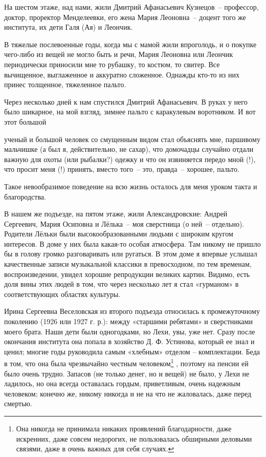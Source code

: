 На шестом этаже, над нами, жили Дмитрий Афанасьевич Кузнецов~-- профессор, доктор, проректор Менделеевки, его жена Мария Леоновна~-- доцент того же института, их дети Галя (Ая) и Леончик.



В тяжелые послевоенные годы, когда мы с мамой жили впроголодь, и о покупке чего-либо из вещей не могло быть  и  речи,  Мария Леоновна или Леончик периодически приносили мне то рубашку, то костюм, то свитер. Все вычищенное, выглаженное и аккуратно сложенное. Однажды кто-то из них принес толщенное, тяжеленное пальто.

Через несколько дней к нам спустился Дмитрий Афанасьевич. В руках у него было шикарное, на мой взгляд, зимнее пальто с каракулевым воротником. И вот этот большой 




\restoregeometry




\noindent ученый и большой человек со смущенным видом стал объяснять мне, паршивому мальчишке (а был я, действительно,  не сахар), что домочадцы случайно отдали важную для охоты (или рыбалки?) одежку и что он извиняется передо мной (!), что просит меня (!) принять, вместо того~-- это, правда~-- хорошее, пальто.



Такое невообразимое поведение на всю жизнь осталось для меня уроком такта и благородства.

\indent

В нашем же подъезде, на пятом этаже, жили Александровские: Андрей Сергеевич, Мария Осиповна и Лёлька~-- моя сверстница (о ней~-- отдельно). Родители Лёльки были высокообразованными людьми с широким кругом интересов. В доме у них была какая-то особая атмосфера. Там никому не пришло бы в голову громко разговаривать или ругаться. В этом доме я впервые услышал качественные записи музыкальной классики в превосходном, по тем временам, воспроизведении, увидел хорошие репродукции великих картин. Видимо, есть доля вины этих людей в том, что через несколько лет я стал «гурманом» в соответствующих областях культуры.

\indent

Ирина Сергеевна Веселовская из второго подъезда относилась к промежуточному поколению (1926 или 1927 г. р.): между «старшими ребятами» и сверстниками моего брата. Наши дети были одногодками, но Лехи, увы, уже нет. Сразу после окончания института она попала в хозяйство Д. Ф. Устинова, который ее знал и ценил; многие годы руководила самым «хлебным» отделом – комплектации. Беда в том, что она была чрезвычайно честным человеком\protect\footnote{Она никогда не принимала никаких проявлений благодарности, даже искренних, даже совсем недорогих, не пользовалась обширными деловыми связями, даже в очень важных для себя случаях.} , поэтому на пенсии ей было очень трудно. Запасов (не только денег, но и вещей) не было, у Лехи не ладилось, но она всегда оставалась гордым, приветливым, очень надежным человеком; конечно же, никому никогда и не на что не жаловалась, даже перед смертью. 

